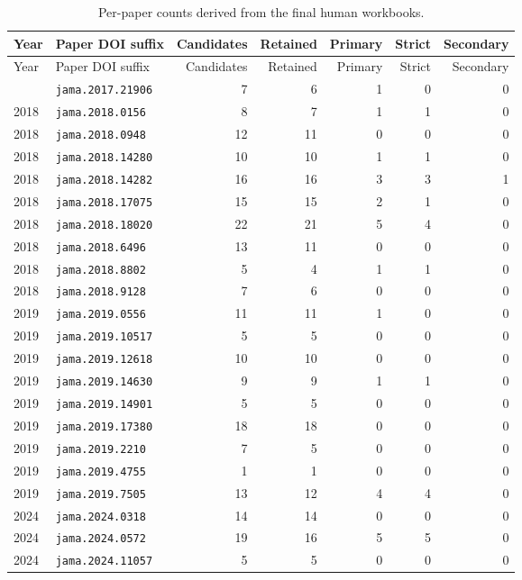 \small
\begin{longtable}{llrrrrr}
\caption{Per-paper counts derived from the final human workbooks.}\label{tab:perpaper}\\
\toprule
Year & Paper DOI suffix & Candidates & Retained & Primary & Strict & Secondary \\
\midrule
\endfirsthead
\toprule
Year & Paper DOI suffix & Candidates & Retained & Primary & Strict & Secondary \\
\midrule
\endhead
\bottomrule
\endfoot
2018 & \texttt{jama.2017.21906} & 7 & 6 & 1 & 0 & 0 \\
2018 & \texttt{jama.2018.0156} & 8 & 7 & 1 & 1 & 0 \\
2018 & \texttt{jama.2018.0948} & 12 & 11 & 0 & 0 & 0 \\
2018 & \texttt{jama.2018.14280} & 10 & 10 & 1 & 1 & 0 \\
2018 & \texttt{jama.2018.14282} & 16 & 16 & 3 & 3 & 1 \\
2018 & \texttt{jama.2018.17075} & 15 & 15 & 2 & 1 & 0 \\
2018 & \texttt{jama.2018.18020} & 22 & 21 & 5 & 4 & 0 \\
2018 & \texttt{jama.2018.6496} & 13 & 11 & 0 & 0 & 0 \\
2018 & \texttt{jama.2018.8802} & 5 & 4 & 1 & 1 & 0 \\
2018 & \texttt{jama.2018.9128} & 7 & 6 & 0 & 0 & 0 \\
2019 & \texttt{jama.2019.0556} & 11 & 11 & 1 & 0 & 0 \\
2019 & \texttt{jama.2019.10517} & 5 & 5 & 0 & 0 & 0 \\
2019 & \texttt{jama.2019.12618} & 10 & 10 & 0 & 0 & 0 \\
2019 & \texttt{jama.2019.14630} & 9 & 9 & 1 & 1 & 0 \\
2019 & \texttt{jama.2019.14901} & 5 & 5 & 0 & 0 & 0 \\
2019 & \texttt{jama.2019.17380} & 18 & 18 & 0 & 0 & 0 \\
2019 & \texttt{jama.2019.2210} & 7 & 5 & 0 & 0 & 0 \\
2019 & \texttt{jama.2019.4755} & 1 & 1 & 0 & 0 & 0 \\
2019 & \texttt{jama.2019.7505} & 13 & 12 & 4 & 4 & 0 \\
2024 & \texttt{jama.2024.0318} & 14 & 14 & 0 & 0 & 0 \\
2024 & \texttt{jama.2024.0572} & 19 & 16 & 5 & 5 & 0 \\
2024 & \texttt{jama.2024.11057} & 5 & 5 & 0 & 0 & 0 \\

\end{longtable}
